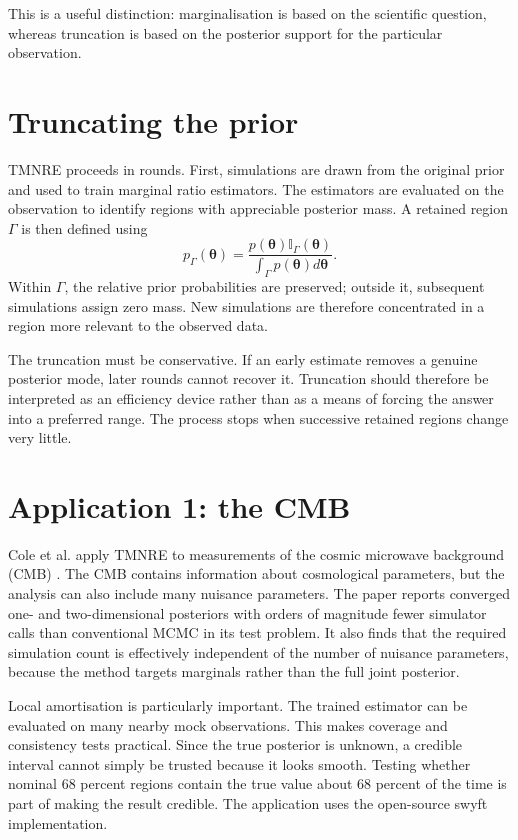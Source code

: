 ﻿\documentclass[11pt,a4paper]{article}
\begin{document}
This is a useful distinction: marginalisation is based on the scientific question, whereas truncation is based on the posterior support for the particular observation.

\section{Truncating the prior}
TMNRE proceeds in rounds. First, simulations are drawn from the original prior and used to train marginal ratio estimators. The estimators are evaluated on the observation to identify regions with appreciable posterior mass. A retained region $\Gamma$ is then defined using
\begin{equation}
p_{\Gamma}(\bm{\theta})=
\frac{p(\bm{\theta})\mathbb{I}_{\Gamma}(\bm{\theta})}
{\int_{\Gamma}p(\bm{\theta})d\bm{\theta}}.
\end{equation}
Within $\Gamma$, the relative prior probabilities are preserved; outside it, subsequent simulations assign zero mass. New simulations are therefore concentrated in a region more relevant to the observed data.

The truncation must be conservative. If an early estimate removes a genuine posterior mode, later rounds cannot recover it. Truncation should therefore be interpreted as an efficiency device rather than as a means of forcing the answer into a preferred range. The process stops when successive retained regions change very little.

\section{Application 1: the CMB}
Cole et al. apply TMNRE to measurements of the cosmic microwave background (CMB) \citep{tmnreCosmology}. The CMB contains information about cosmological parameters, but the analysis can also include many nuisance parameters. The paper reports converged one- and two-dimensional posteriors with orders of magnitude fewer simulator calls than conventional MCMC in its test problem. It also finds that the required simulation count is effectively independent of the number of nuisance parameters, because the method targets marginals rather than the full joint posterior.

Local amortisation is particularly important. The trained estimator can be evaluated on many nearby mock observations. This makes coverage and consistency tests practical. Since the true posterior is unknown, a credible interval cannot simply be trusted because it looks smooth. Testing whether nominal 68 percent regions contain the true value about 68 percent of the time is part of making the result credible. The application uses the open-source swyft implementation.
\end{document}
